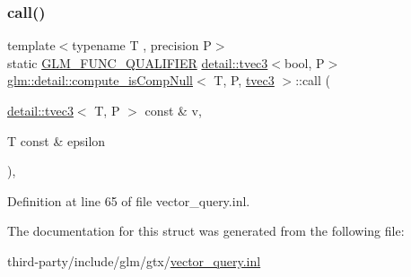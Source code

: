 \subsubsection{\texorpdfstring{call()}{call()}}
{\footnotesize\ttfamily template$<$typename T , precision P$>$ \\
static \hyperlink{setup_8hpp_a33fdea6f91c5f834105f7415e2a64407}{G\+L\+M\+\_\+\+F\+U\+N\+C\+\_\+\+Q\+U\+A\+L\+I\+F\+I\+ER} \hyperlink{structglm_1_1detail_1_1tvec3}{detail\+::tvec3}$<$bool, P$>$ \hyperlink{structglm_1_1detail_1_1compute__is_comp_null}{glm\+::detail\+::compute\+\_\+is\+Comp\+Null}$<$ T, P, \hyperlink{structglm_1_1detail_1_1tvec3}{tvec3} $>$\+::call (\begin{DoxyParamCaption}\item[{\hyperlink{structglm_1_1detail_1_1tvec3}{detail\+::tvec3}$<$ T, P $>$ const \&}]{v,  }\item[{T const \&}]{epsilon }\end{DoxyParamCaption})\hspace{0.3cm}{\ttfamily [inline]}, {\ttfamily [static]}}



Definition at line 65 of file vector\+\_\+query.\+inl.



The documentation for this struct was generated from the following file\+:\begin{DoxyCompactItemize}
\item 
third-\/party/include/glm/gtx/\hyperlink{vector__query_8inl}{vector\+\_\+query.\+inl}\end{DoxyCompactItemize}
